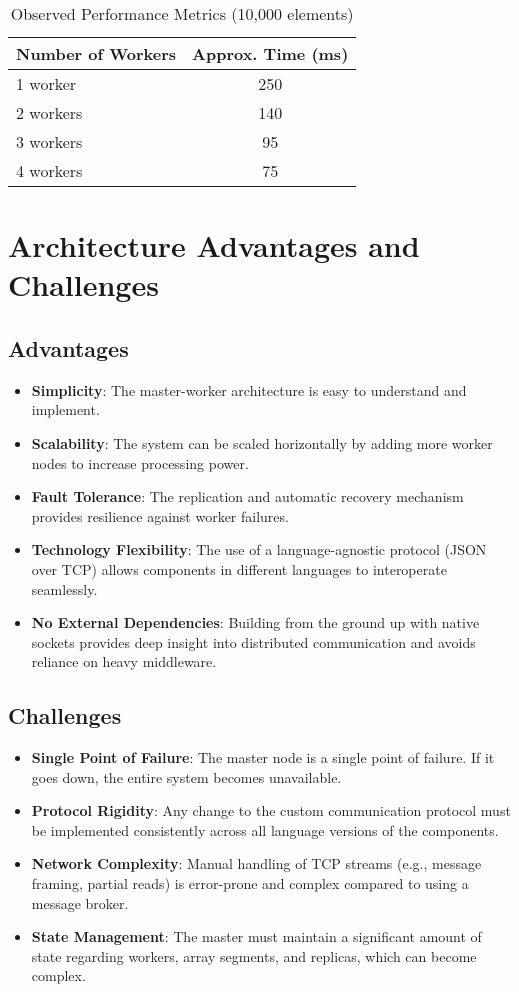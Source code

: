 \documentclass[10pt,a4paper]{article}
\theoremstyle{definition}
\theoremstyle{remark}
\begin{document}
\begin{table}[H]
\centering
\caption{Observed Performance Metrics (10,000 elements)}
\begin{tabular}{|l|c|}
\hline
\textbf{Number of Workers} & \textbf{Approx. Time (ms)} \\ \hline
1 worker & 250 \\ \hline
2 workers & 140 \\ \hline
3 workers & 95 \\ \hline
4 workers & 75 \\ \hline
\end{tabular}
\end{table}

\section{Architecture Advantages and Challenges}

\subsection{Advantages}
\begin{itemize}
    \item \textbf{Simplicity}: The master-worker architecture is easy to understand and implement.
    \item \textbf{Scalability}: The system can be scaled horizontally by adding more worker nodes to increase processing power.
    \item \textbf{Fault Tolerance}: The replication and automatic recovery mechanism provides resilience against worker failures.
    \item \textbf{Technology Flexibility}: The use of a language-agnostic protocol (JSON over TCP) allows components in different languages to interoperate seamlessly.
    \item \textbf{No External Dependencies}: Building from the ground up with native sockets provides deep insight into distributed communication and avoids reliance on heavy middleware.
\end{itemize}

\subsection{Challenges}
\begin{itemize}
    \item \textbf{Single Point of Failure}: The master node is a single point of failure. If it goes down, the entire system becomes unavailable.
    \item \textbf{Protocol Rigidity}: Any change to the custom communication protocol must be implemented consistently across all language versions of the components.
    \item \textbf{Network Complexity}: Manual handling of TCP streams (e.g., message framing, partial reads) is error-prone and complex compared to using a message broker.
    \item \textbf{State Management}: The master must maintain a significant amount of state regarding workers, array segments, and replicas, which can become complex.
\end{itemize}
\end{document}
